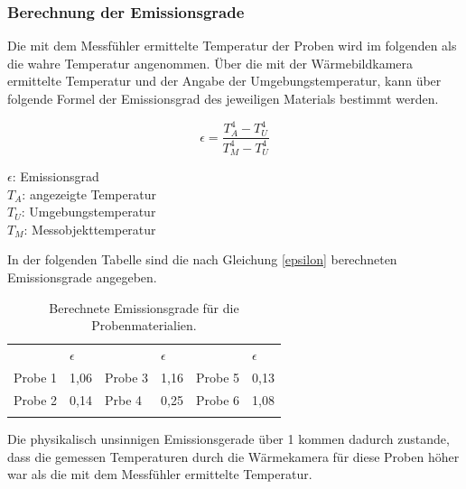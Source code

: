 \subsubsection{Berechnung der Emissionsgrade}

Die mit dem Messfühler ermittelte Temperatur der Proben wird im folgenden als die wahre Temperatur angenommen. Über die mit der Wärmebildkamera ermittelte Temperatur und der Angabe der Umgebungstemperatur, kann über folgende Formel der Emissionsgrad des jeweiligen Materials bestimmt werden. 

\begin{equation}\label{epsilon}
\epsilon=\frac{T_A^4-T_U^4}{T_M^4-T_U^4}
\end{equation}

\begin{center}
	\begin{small}
		$\epsilon$: Emissionsgrad\\
		$T_A$: angezeigte Temperatur\\
		$T_U$: Umgebungstemperatur\\
		$T_M$: Messobjekttemperatur\\
	\end{small}
\end{center}

In der folgenden Tabelle sind die nach Gleichung \ref{epsilon} berechneten Emissionsgrade angegeben. 

\begin{table}[H]
	\centering
	\caption{Berechnete Emissionsgrade für die Probenmaterialien.}
	\label{tab:emissionsgrade}
	\begin{tabular}{llllll}
		&    $\epsilon$  &        &  $\epsilon$    &         &  $\epsilon$    \\
		Probe 1 & 1,06 & Probe 3 & 1,16 & Probe 5 & 0,13 \\
		Probe 2 & 0,14 & Prbe 4  & 0,25 & Probe 6 & 1,08 \\
		&      &         &      &         &     
	\end{tabular}
\end{table}

Die physikalisch unsinnigen Emissionsgerade über 1 kommen dadurch zustande, dass die gemessen Temperaturen durch die Wärmekamera für diese Proben höher war als die mit dem Messfühler ermittelte Temperatur. 